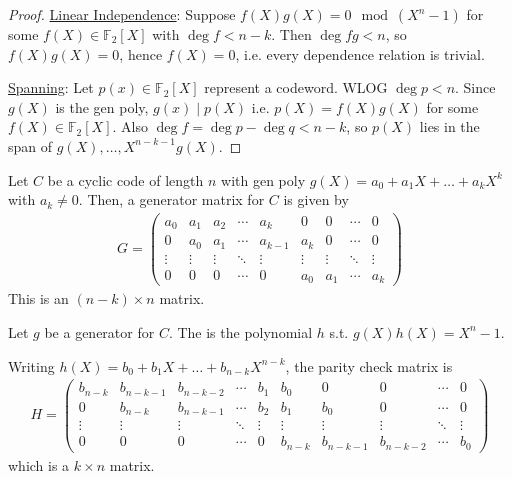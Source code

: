\begin{proof}
    \underline{Linear Independence}: Suppose $f(X) g(X) = 0 \mod (X^n - 1)$ for some $f(X) \in \mathbb{F}_2[X]$ with $\deg f < n - k$.
    Then $\deg fg < n$, so $f(X)g(X) = 0$, hence $f(X) = 0$, i.e. every dependence relation is trivial.

    \underline{Spanning}: Let $p(x) \in \mathbb{F}_2[X]$ represent a codeword.
    WLOG  $\deg p < n$.
    Since $g(X)$ is the gen poly, $g(x) \mid p(X)$ i.e. $p(X) = f(X) g(X)$ for some $f(X) \in \mathbb{F}_2[X]$.
    Also $\deg f = \deg p - \deg q < n - k$, so $p(X)$ lies in the span of $g(X), \dots, X^{n - k - 1} g(X)$.
\end{proof}

\begin{corollary}
    Let $C$ be a cyclic code of length $n$ with gen poly $g(X) = a_0 + a_1 X + \dots + a_k X^k$ with $a_k \neq 0$.
    Then, a generator matrix for $C$ is given by
    \begin{align*}
        G = \begin{pmatrix}
            a_0 & a_1 & a_2 & \cdots & a_k & 0 & 0 & \cdots & 0 \\
            0 & a_0 & a_1 & \cdots & a_{k-1} & a_k & 0 & \cdots & 0 \\
            \vdots & \vdots & \vdots & \ddots & \vdots & \vdots & \vdots & \ddots & \vdots \\
            0 & 0 & 0 & \cdots & 0 & a_0 & a_1 & \cdots & a_k
        \end{pmatrix}
    \end{align*}
    This is an $(n - k) \times n$ matrix.
\end{corollary}

\begin{definition}
    Let $g$ be a generator for $C$.
    The  is the polynomial $h$ s.t. $g(X) h(X) = X^n - 1$.
\end{definition}

\begin{corollary}
    Writing $h(X) = b_0 + b_1 X + \dots + b_{n-k} X^{n-k}$, the parity check matrix is
    \begin{align*}
        H = \begin{pmatrix}
            b_{n-k} & b_{n-k-1} & b_{n-k-2} & \cdots & b_1 & b_0 & 0 & 0 & \cdots & 0 \\
            0 & b_{n-k} & b_{n-k-1} & \cdots & b_2 & b_1 & b_0 & 0 & \cdots & 0 \\
            \vdots & \vdots & \vdots & \ddots & \vdots & \vdots & \vdots & \vdots & \ddots & \vdots \\
            0 & 0 & 0 & \cdots & 0 & b_{n-k} & b_{n-k-1} & b_{n-k-2} & \cdots & b_0
        \end{pmatrix}
    \end{align*}
    which is a $k \times n$ matrix.
\end{corollary}

